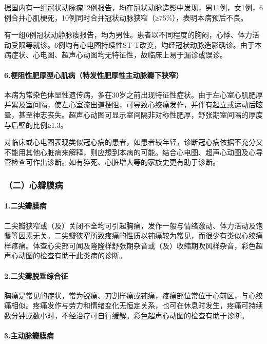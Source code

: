 据国内有一组冠状动脉瘤12例报告，均在冠状动脉造影中发现，男11例，女1例，6例合并心肌梗死，10例同时合并冠状动脉狭窄（≥75\%），表明本病预后不良。

有一组6例冠状动静脉瘘报告，均为男性。患者以不同程度的胸闷，心悸、体力活动受限等就诊。6例均有心电图持续性ST-T改变，均经冠状动脉造影确诊。由于本病症状、心电图、超声心动图均无特征性，故临床上易于漏诊或误诊。

\paragraph{6.梗阻性肥厚型心肌病（特发性肥厚性主动脉瓣下狭窄）}

本病为常染色体显性遗传病，多在30岁之前出现特征性症状。由于左心室心肌肥厚并累及室间隔，使左心室流出道梗阻，可导致心绞痛发作，并伴有起立或运动后眩晕，甚至神志丧失。超声心动图可显示室间隔非对称性肥厚，舒张期室间隔的厚度与后壁的比例≥1.3。

对临床或心电图表现类似冠心病的患者，如患者较年轻，诊断冠心病依据不充分又不能用其他心脏病来解释，则应想到本病的可能。结合心电图、超声心动图及心导管检查可作出诊断。如有猝死、心脏增大等的家族史更有助于诊断。

\subsubsection{（二）心瓣膜病}

\paragraph{1.二尖瓣膜病}

二尖瓣狭窄或（及）关闭不全均可引起胸痛，发作一般与情绪激动、体力活动及饱餐等因素无关。二尖瓣狭窄所致疼痛的性质以钝痛较为常见，而很少有类似心绞痛样疼痛。体查心尖部可闻及隆隆样舒张期杂音或（及）收缩期吹风样杂音，彩色超声心动图的检查有助于此类病的诊断。

\paragraph{2.二尖瓣脱垂综合征}

胸痛是常见的症状，常为锐痛、刀割样痛或钝痛，疼痛部位常位于心前区，与心绞痛相似。疼痛发作与劳力和情绪变化无恒定关系，也可在休息时发生，疼痛可持续数分钟或数小时，不经治疗可自行缓解。彩色超声心动图的检查有助于诊断。

\paragraph{3.主动脉瓣膜病}

